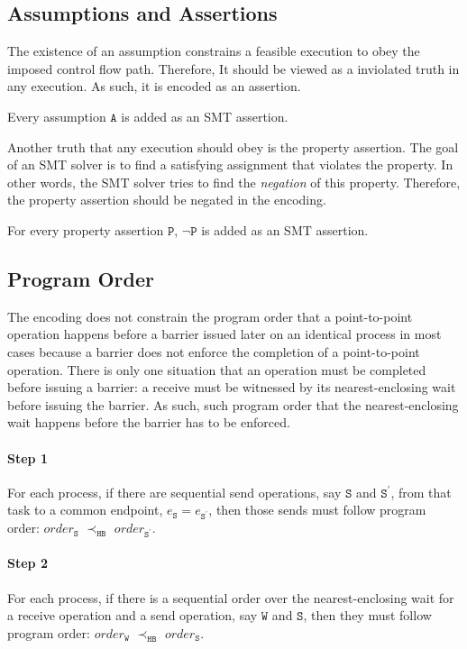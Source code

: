 \subsection{Assumptions and Assertions}
The existence of an assumption constrains a feasible execution to obey the imposed control flow path. Therefore, It should be viewed as a inviolated truth in any execution. As such, it is encoded as an assertion. 
\begin{definition}[Assumption] \label{def:assm}
Every assumption $\mathtt{A}$ is added as an SMT assertion.
\end{definition}

Another truth that any execution should obey is the property assertion. The goal of an SMT solver is to find a satisfying assignment that violates the property. In other words, the SMT solver tries to find the \textit{negation} of this property. Therefore, the property assertion should be negated in the encoding.
\begin{definition} \label{def:assert}
For every property assertion $\mathtt{P}$, $\neg \mathtt{P}$ is added as
an SMT assertion.
\end{definition}

\subsection{Program Order}
The encoding does not constrain the program order that a point-to-point operation happens before a barrier issued later on an identical process in most cases because a barrier does not enforce the completion of a point-to-point operation. There is only one situation that an operation must be completed before issuing a barrier: a receive must be witnessed by its nearest-enclosing wait before issuing the barrier. As such, such program order that the nearest-enclosing wait happens before the barrier has to be enforced.

\paragraph*{Step 1} For each process, if there are sequential send
operations, say $\mathtt{S}$ and $\mathtt{S^\prime}$, from that task
to a common endpoint, $e_\mathtt{S} = e_\mathtt{S^\prime}$, then those
sends must follow program order: $\mathit{order}_\mathtt{S}$
$\prec_\mathtt{HB}$ $\mathit{order}_\mathtt{S^\prime}$.

\paragraph*{Step 2} For each process, if there is a sequential order over the nearest-enclosing wait for a receive operation and a send operation, say $\mathtt{W}$ and $\mathtt{S}$, then they must follow program order: $\mathit{order}_\mathtt{W}$
$\prec_\mathtt{HB}$ $\mathit{order}_\mathtt{S}$.


